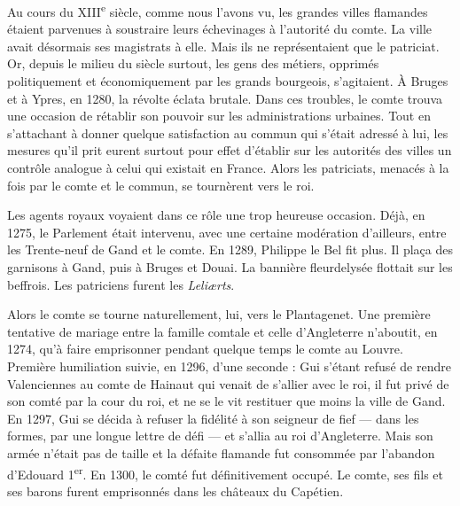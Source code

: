 \documentclass[french,twoside]{book} %
\begin{document}
Au cours du XIII\textsuperscript{e} siècle, comme nous l’avons vu, les grandes villes flamandes étaient parvenues à soustraire leurs échevinages à l’autorité du comte. La ville avait désormais ses magistrats à elle. Mais ils ne représentaient que le patriciat. Or, depuis le milieu du siècle surtout, les gens des métiers, opprimés politiquement et économiquement par les grands bourgeois, s’agitaient. À Bruges et à Ypres, en 1280, la révolte éclata brutale. Dans ces troubles, le comte trouva une occasion de rétablir son pouvoir sur les administrations urbaines. Tout en s’attachant à donner quelque satisfaction au commun qui s’était adressé à lui, les mesures qu’il prit eurent surtout pour effet d’établir sur les autorités des villes un contrôle analogue à celui qui existait en France. Alors les patriciats, menacés à la fois par le comte et le commun, se tournèrent vers le roi.\par
Les agents royaux voyaient dans ce rôle une trop heureuse occasion. Déjà, en 1275, le Parlement était intervenu, avec une certaine modération d’ailleurs, entre les Trente-neuf de Gand et le comte. En 1289, Philippe le Bel fit plus. Il plaça des garnisons à  
\label{p25} Gand, puis à Bruges et Douai. La bannière fleurdelysée flottait sur les beffrois. Les patriciens furent les \emph{Leliærts}.\par
Alors le comte se tourne naturellement, lui, vers le Plantagenet. Une première tentative de mariage entre la famille comtale et celle d’Angleterre n’aboutit, en 1274, qu’à faire emprisonner pendant quelque temps le comte au Louvre. Première humiliation suivie, en 1296, d’une seconde : Gui s’étant refusé de rendre Valenciennes au comte de Hainaut qui venait de s’allier avec le roi, il fut privé de son comté par la cour du roi, et ne se le vit restituer que moins la ville de Gand. En 1297, Gui se décida à refuser la fidélité à son seigneur de fief — dans les formes, par une longue lettre de défi — et s’allia au roi d’Angleterre. Mais son armée n’était pas de taille et la défaite flamande fut consommée par l’abandon d’Edouard 1\textsuperscript{er}. En 1300, le comté fut définitivement occupé. Le comte, ses fils et ses barons furent emprisonnés dans les châteaux du Capétien.\par
\end{document}

